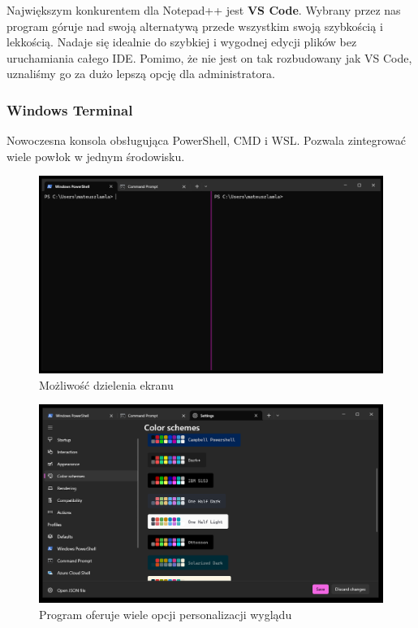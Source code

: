 \documentclass[0.82pt,a4paper]{article}
\begin{document}
    Największym konkurentem dla Notepad++ jest \textbf{VS Code}. Wybrany przez nas program góruje nad swoją alternatywą przede wszystkim swoją szybkością i lekkością. Nadaje się idealnie do szybkiej i wygodnej edycji plików bez uruchamiania całego IDE. Pomimo, że nie jest on tak rozbudowany jak VS Code, uznaliśmy go za dużo lepszą opcję dla administratora.
\newpage
\subsubsection{Windows Terminal}
    Nowoczesna konsola obsługująca PowerShell, CMD i WSL. Pozwala zintegrować wiele powłok w jednym środowisku.

    \begin{figure}[H]
        \centering
        \includegraphics[width=0.8\linewidth]{media/Windows Terminal/1_wiele_kart.PNG}
        \caption[]{Możliwość dzielenia ekranu}
        \label{fig:terminal_dzielenie_ekranu}
    \end{figure}

    \begin{figure}[H]
        \centering
        \includegraphics[width=0.8\linewidth]{media/Windows Terminal/2_mozliwosc_personalizacji_wygladu.PNG}
        \caption[]{Program oferuje wiele opcji personalizacji wyglądu}
        \label{fig:terminal_presonalizacja}
    \end{figure}
    
\end{document}
